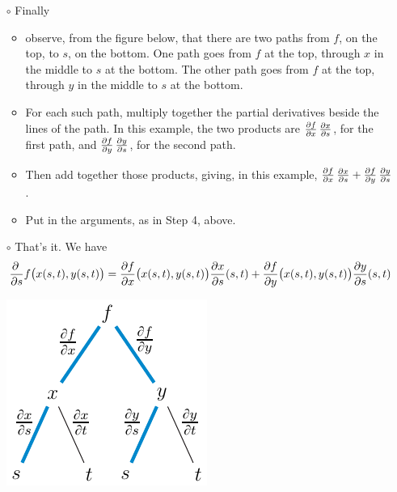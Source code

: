 \begin{itemize}
\begin{efig}
\begin{center}
\end{center}
\end{efig}
\item[$\circ$]
Finally
   \begin{itemize}\itemsep1pt \parskip0pt 
       \item observe, from the figure below, that there are two paths
               from $f$, on the top, to $s$, on the bottom. One path goes from
               $f$ at the top, through $x$ in the middle to $s$ at the
               bottom.  The other path goes from
               $f$ at the top, through $y$ in the middle to $s$ at the
               bottom.  
       \item For each such path, multiply together the partial derivatives
               beside the lines of the path. In this example, the two products 
               are $\pdiff{f}{x}\,\pdiff{x}{s}$, for the first path, and
               $\pdiff{f}{y}\,\pdiff{y}{s}$, for the second path.
       \item Then add together those products, giving, in this example,
              $\pdiff{f}{x}\,\pdiff{x}{s}+\pdiff{f}{y}\,\pdiff{y}{s}$.
       \item Put in the arguments, as in Step 4, above.
   \end{itemize}
\item[$\circ$]
   That's it. We have 
\begin{equation*}
\pdiff{}{s}f\big(x(s,t),y(s,t)\big)=
  \pdiff{f}{x}\big(x(s,t),y(s,t)\big)
  \pdiff{x}{s}(s,t)
  +\pdiff{f}{y}\big(x(s,t),y(s,t)\big)
  \pdiff{y}{s}(s,t)
\end{equation*}
\begin{efig}
\begin{center}
   \includegraphics{decTreeS.pdf}
\end{center}
\end{efig}
\end{itemize} 

